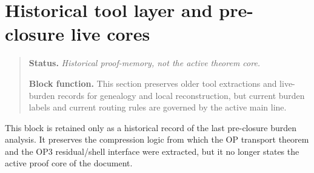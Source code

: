\section*{Historical tool layer and pre-closure live cores}
\begin{quote}\small
\noindent\textbf{Status.} \emph{Historical proof-memory, not the active theorem core.}\par
\noindent\textbf{Block function.} This section preserves older tool extractions and live-burden records for genealogy and local reconstruction, but current burden labels and current routing rules are governed by the active main line.
\end{quote}
\begin{remark}
This block is retained only as a historical record of the last pre-closure burden analysis. It preserves the compression logic from which the OP transport theorem and the OP3 residual/shell interface were extracted, but it no longer states the active proof core of the document.
\end{remark}

